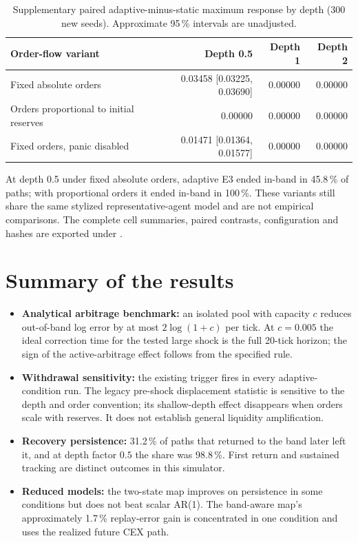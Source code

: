 \begin{table}[htbp]
\centering
\caption{Supplementary paired adaptive-minus-static maximum response by depth (300 new seeds). Approximate 95\,\% intervals are unadjusted.}
\label{tab:engineering-sensitivity}
\small
\begin{tabular}{@{}lrrr@{}}
\toprule
Order-flow variant & Depth 0.5 & Depth 1 & Depth 2 \\
\midrule
Fixed absolute orders & 0.03458 [0.03225, 0.03690] & 0.00000 & 0.00000 \\
Orders proportional to initial reserves & 0.00000 & 0.00000 & 0.00000 \\
Fixed orders, panic disabled & 0.01471 [0.01364, 0.01577] & 0.00000 & 0.00000 \\
\bottomrule
\end{tabular}
\end{table}

At depth 0.5 under fixed absolute orders, adaptive E3 ended in-band in 45.8\,\% of paths; with proportional orders it ended in-band in 100\,\%. These variants still share the same stylized representative-agent model and are not empirical comparisons. The complete cell summaries, paired contrasts, configuration and hashes are exported under .

\section{Summary of the results}

\begin{itemize}
  \item \textbf{Analytical arbitrage benchmark:} an isolated pool with capacity $c$ reduces out-of-band log error by at most $2\log(1+c)$ per tick. At $c=0.005$ the ideal correction time for the tested large shock is the full 20-tick horizon; the sign of the active-arbitrage effect follows from the specified rule.
  \item \textbf{Withdrawal sensitivity:} the existing trigger fires in every adaptive-condition run. The legacy pre-shock displacement statistic is sensitive to the depth and order convention; its shallow-depth effect disappears when orders scale with reserves. It does not establish general liquidity amplification.
  \item \textbf{Recovery persistence:} 31.2\,\% of paths that returned to the band later left it, and at depth factor $0.5$ the share was 98.8\,\%. First return and sustained tracking are distinct outcomes in this simulator.
  \item \textbf{Reduced models:} the two-state map improves on persistence in some conditions but does not beat scalar AR(1). The band-aware map's approximately 1.7\,\% replay-error gain is concentrated in one condition and uses the realized future CEX path.
\end{itemize}
